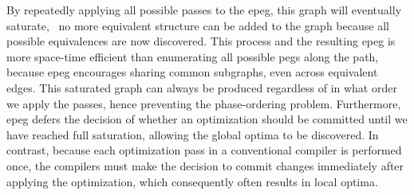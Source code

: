 By repeatedly applying all possible passes to the \gls{epeg}, this graph will
eventually saturate, \ie~no more equivalent structure can be added to the graph
because all possible equivalences are now discovered.  This process and the
resulting \gls{epeg} is more space-time efficient than enumerating all possible
\glspl{peg} along the path, because \gls{epeg} encourages sharing common
subgraphs, even across equivalent edges.  This saturated graph can always be
produced regardless of in what order we apply the passes, hence preventing
the phase-ordering problem.  Furthermore, \gls{epeg} defers the decision
of whether an optimization should be committed until we have reached full
saturation, allowing the global optima to be discovered.  In contrast, because
each optimization pass in a conventional compiler is performed once, the
compilers must make the decision to commit changes immediately after applying
the optimization, which consequently often results in local optima.
